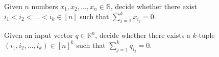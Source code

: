 \begin{problem}[\(k\)-SUM]
	Given \(n\) numbers \(x_1, x_2, \ldots, x_n \in \mathbb{R}\), decide
	whether there exist \(i_1 < i_2 < \ldots < i_k \in [n]\) such that
	\(\sum_{j=1}^k x_{i_j} = 0\).
\end{problem}

\begin{problem}[\(k\)-SUM]
	 Given an input vector \(q\in\mathbb{R}^n\), decide whether there exists a
	 $k$-tuple \((i_1, i_2,\ldots ,i_k) \in {[n]}^k\) such that \(\sum_{j=1}^k
	 q_{i_j} = 0\).
\end{problem}
